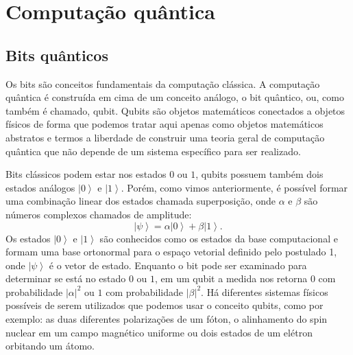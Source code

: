 \section{Computação quântica}

\subsection{Bits quânticos}
Os bits são conceitos fundamentais da computação  clássica. A computação quântica é construída em cima de um conceito análogo, o bit quântico, ou, como também é chamado, qubit.  Qubits  são objetos matemáticos conectados a objetos físicos de forma que podemos tratar aqui apenas como objetos matemáticos abstratos e termos a liberdade de construir uma teoria geral de computação quântica que não depende de um sistema específico para ser realizado.

Bits clássicos podem estar nos estados $0$ ou $1$, qubits possuem também dois estados análogos $\left|0\right\rangle $ e $\left|1\right\rangle $. Porém, como vimos anteriormente, é possível formar uma combinação linear dos estados chamada superposição, onde $\alpha$ e $\beta$ são números complexos chamados de amplitude:
\begin{equation}
\left|\psi\right\rangle =\alpha\left|0\right\rangle +\beta\left|1\right\rangle \label{qubit 1}
. \end{equation}
Os estados $\left|0\right\rangle $ e $\left|1\right\rangle $ são conhecidos como os estados da base computacional e formam uma base ortonormal para o espaço vetorial definido pelo postulado 1, onde $\left|\psi\right\rangle$ é o vetor de estado.  Enquanto o bit pode ser examinado para determinar se está no estado $0$ ou $1$, em um qubit a medida nos retorna $0$ com probabilidade $\left|\alpha\right|^{2}$ ou $1$ com probabilidade $\left|\beta\right|^{2}$. Há diferentes sistemas físicos possíveis de serem utilizados que podemos usar o conceito qubits, como por exemplo: as duas diferentes polarizações de um fóton, o alinhamento do spin nuclear em um campo magnético uniforme ou dois estados de um elétron orbitando um átomo.

